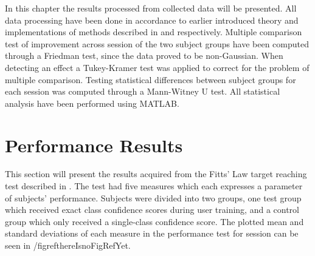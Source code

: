 
In this chapter the results processed from collected data will be presented. All data processing have been done in accordance to earlier introduced theory and implementations of methods described in  and  respectively. Multiple comparison test of improvement across session of the two subject groups have been computed through a Friedman test, since the data proved to be non-Gaussian. When detecting an effect a Tukey-Kramer test was applied to correct for the problem of multiple comparison. Testing statistical differences between subject groups for each session was computed through a Mann-Witney U test. All statistical analysis have been performed using MATLAB.


\section{Performance Results} \label{sec:R:fitts}
This section will present the results acquired from the Fitts' Law target reaching test described in . The test had five measures which each expresses a parameter of subjects' performance. Subjects were divided into two groups, one test group which received exact class confidence scores during user training, and a control group which only received a single-class confidence score. The plotted mean and standard deviations of each measure in the performance test for session can be seen in /figref{thereIsnoFigRefYet}.

